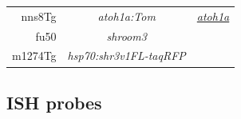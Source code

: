 \documentclass[11pt,singlespacinge,twoside]{reedthesis} %
\begin{document}
\begin{longtable}[]{@{}rcl@{}}
\begin{minipage}[t]{0.12\columnwidth}
nns8Tg\strut
\end{minipage} & \begin{minipage}[t]{0.29\columnwidth}\centering
\emph{atoh1a:Tom}\strut
\end{minipage} & \begin{minipage}[t]{0.50\columnwidth}\raggedright
\href{//zfin.org/ZDB-FISH-150901-21622}{\emph{atoh1a}}\strut
\end{minipage}\tabularnewline
\begin{minipage}[t]{0.12\columnwidth}\raggedleft
fu50\strut
\end{minipage} & \begin{minipage}[t]{0.29\columnwidth}\centering
\emph{shroom3}\strut
\end{minipage} & \begin{minipage}[t]{0.50\columnwidth}\raggedright
\strut
\end{minipage}\tabularnewline
\begin{minipage}[t]{0.12\columnwidth}\raggedleft
m1274Tg\strut
\end{minipage} & \begin{minipage}[t]{0.29\columnwidth}\centering
\emph{hsp70:shr3v1FL-taqRFP}\strut
\end{minipage} & \begin{minipage}[t]{0.50\columnwidth}\raggedright
\strut
\end{minipage}\tabularnewline
\bottomrule
\end{longtable}
\hypertarget{mat-probes}{%
\subsection{ISH probes}\label{mat-probes}}
\end{document}
